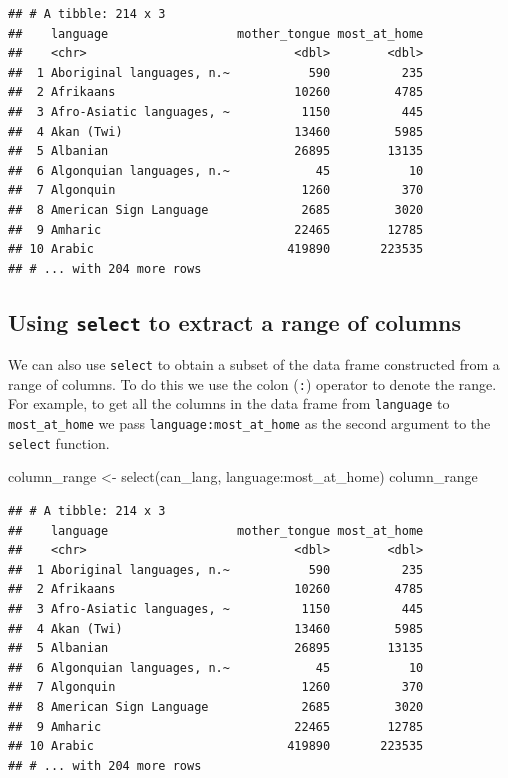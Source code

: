 \documentclass[
]{krantz}
\makeatletter
\newenvironment{Shaded}{\begin{snugshade}}{\end{snugshade}}
\newcommand{\FunctionTok}[1]{\textcolor[rgb]{0,0,0}{#1}}
\newcommand{\NormalTok}[1]{#1}
\newcommand{\OtherTok}[1]{\textcolor[rgb]{0.37,0.37,0.37}{#1}}
\newcommand{\SpecialCharTok}[1]{\textcolor[rgb]{0,0,0}{#1}}
\newenvironment{kframe}{%
\medskip{}
\setlength{\fboxsep}{.8em}
 \def\at@end@of@kframe{}%
 \ifinner\ifhmode%
  \def\at@end@of@kframe{\end{minipage}}%
  \begin{minipage}{\columnwidth}%
 \fi\fi%
 \def\FrameCommand##1{\hskip\@totalleftmargin \hskip-\fboxsep
 \colorbox{shadecolor}{##1}\hskip-\fboxsep
     \hskip-\linewidth \hskip-\@totalleftmargin \hskip\columnwidth}%
 \MakeFramed {\advance\hsize-\width
   \@totalleftmargin\z@ \linewidth\hsize
   \@setminipage}}%
 {\par\unskip\endMakeFramed%
 \at@end@of@kframe}
\renewenvironment{Shaded}{\begin{kframe}}{\end{kframe}}
\makeatother
\begin{document}
\begin{verbatim}
## # A tibble: 214 x 3
##    language                  mother_tongue most_at_home
##    <chr>                             <dbl>        <dbl>
##  1 Aboriginal languages, n.~           590          235
##  2 Afrikaans                         10260         4785
##  3 Afro-Asiatic languages, ~          1150          445
##  4 Akan (Twi)                        13460         5985
##  5 Albanian                          26895        13135
##  6 Algonquian languages, n.~            45           10
##  7 Algonquin                          1260          370
##  8 American Sign Language             2685         3020
##  9 Amharic                           22465        12785
## 10 Arabic                           419890       223535
## # ... with 204 more rows
\end{verbatim}

\hypertarget{using-select-to-extract-a-range-of-columns}{%
\subsection{\texorpdfstring{Using \texttt{select} to extract a range of columns}{Using select to extract a range of columns}}\label{using-select-to-extract-a-range-of-columns}}

We can also use \texttt{select} to obtain a subset of the data frame constructed from a range of columns. To do this we use the colon (\texttt{:}) operator to denote the range.
For example, to get all the columns in the data frame from \texttt{language} to \texttt{most\_at\_home} we pass \texttt{language:most\_at\_home} as the second argument to the \texttt{select} function.

\begin{Shaded}
\begin{Highlighting}[]
\NormalTok{column\_range }\OtherTok{\textless{}{-}} \FunctionTok{select}\NormalTok{(can\_lang, language}\SpecialCharTok{:}\NormalTok{most\_at\_home)}
\NormalTok{column\_range}
\end{Highlighting}
\end{Shaded}

\begin{verbatim}
## # A tibble: 214 x 3
##    language                  mother_tongue most_at_home
##    <chr>                             <dbl>        <dbl>
##  1 Aboriginal languages, n.~           590          235
##  2 Afrikaans                         10260         4785
##  3 Afro-Asiatic languages, ~          1150          445
##  4 Akan (Twi)                        13460         5985
##  5 Albanian                          26895        13135
##  6 Algonquian languages, n.~            45           10
##  7 Algonquin                          1260          370
##  8 American Sign Language             2685         3020
##  9 Amharic                           22465        12785
## 10 Arabic                           419890       223535
## # ... with 204 more rows
\end{verbatim}
\end{document}
